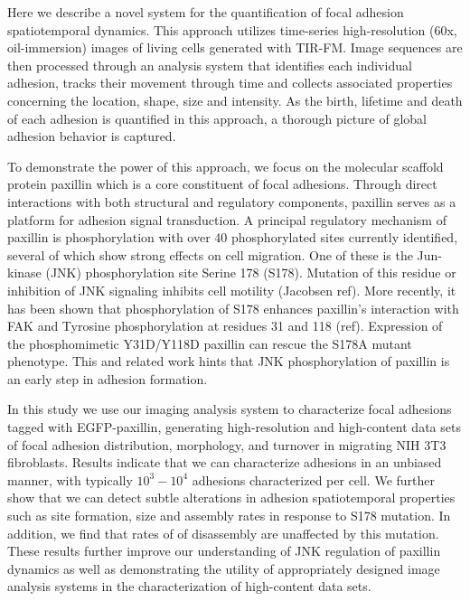 \documentclass[10pt,draft]{article}
\begin{document}
Here we describe a novel system for the quantification of focal adhesion spatiotemporal dynamics. This approach utilizes time-series high-resolution (60x, oil-immersion) images of living cells generated with TIR-FM. Image sequences are then processed through an analysis system that identifies each individual adhesion, tracks their movement through time and collects associated properties concerning the location, shape, size and intensity. As the birth, lifetime and death of each adhesion is quantified in this approach, a thorough picture of global adhesion behavior is captured.

To demonstrate the power of this approach, we focus on the molecular scaffold protein paxillin which is a core constituent of focal adhesions. Through direct interactions with both structural and regulatory components, paxillin serves as a platform for adhesion signal transduction. A principal regulatory mechanism of paxillin is phosphorylation with over 40 phosphorylated sites currently identified, several of which show strong effects on cell migration. One of these is the Jun-kinase (JNK) phosphorylation site Serine 178 (S178). Mutation of this residue or inhibition of JNK signaling inhibits cell motility (Jacobsen ref). More recently, it has been shown that phosphorylation of S178 enhances paxillin's interaction with FAK and Tyrosine phosphorylation at residues 31 and 118 (ref). Expression of the phosphomimetic Y31D/Y118D paxillin can rescue the S178A mutant phenotype. This and related work hints that JNK phosphorylation of paxillin is an early step in adhesion formation. 

In this study we use our imaging analysis system to characterize focal adhesions tagged with EGFP-paxillin, generating high-resolution and high-content data sets of focal adhesion distribution, morphology, and turnover in migrating NIH 3T3 fibroblasts. Results indicate that we can characterize adhesions in an unbiased manner, with typically $10^3-10^4$ adhesions characterized per cell. We further show that we can detect subtle alterations in adhesion spatiotemporal properties such as site formation, size and assembly rates in response to S178 mutation. In addition, we find that rates of of disassembly are unaffected by this mutation. These results further improve our understanding of JNK regulation of paxillin dynamics as well as demonstrating the utility of appropriately designed image analysis systems in the characterization of high-content data sets.

\end{document}
